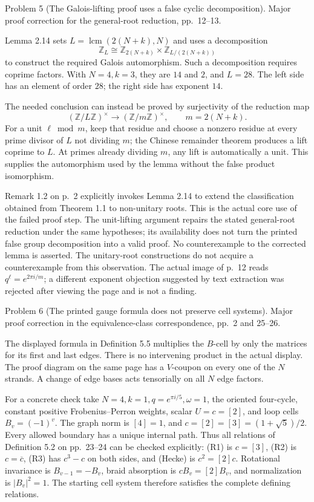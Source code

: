 \documentclass[10pt]{article}
\begin{document}
Problem 5 (The Galois-lifting proof uses a false cyclic decomposition).  Major proof correction for the general-root reduction, pp. 12–13.\par
Lemma 2.14 sets \(L=\operatorname{lcm}(2(N+k),N)\) and uses a decomposition \[\mathbb Z_L\cong
 \mathbb Z_{2(N+k)}\times\mathbb Z_{L/(2(N+k))}\] to construct the required Galois automorphism. Such a decomposition requires coprime factors. With \(N=4,k=3\), they are \(14\) and \(2\), and \(L=28\). The left side has an element of order \(28\); the right side has exponent \(14\).\par
The needed conclusion can instead be proved by surjectivity of the reduction map \[(\mathbb Z/L\mathbb Z)^\times\longrightarrow
 (\mathbb Z/m\mathbb Z)^\times,\qquad m=2(N+k).\] For a unit \(\ell\bmod m\), keep that residue and choose a nonzero residue at every prime divisor of \(L\) not dividing \(m\); the Chinese remainder theorem produces a lift coprime to \(L\). At primes already dividing \(m\), any lift is automatically a unit. This supplies the automorphism used by the lemma without the false product isomorphism.\par
Remark 1.2 on p. 2 explicitly invokes Lemma 2.14 to extend the classification obtained from Theorem 1.1 to non-unitary roots. This is the actual core use of the failed proof step. The unit-lifting argument repairs the stated general-root reduction under the same hypotheses; its availability does not turn the printed false group decomposition into a valid proof. No counterexample to the corrected lemma is asserted. The unitary-root constructions do not acquire a counterexample from this observation. The actual image of p. 12 reads \(q^\ell=e^{2\pi i/m}\); a different exponent objection suggested by text extraction was rejected after viewing the page and is not a finding.\par
Problem 6 (The printed gauge formula does not preserve cell systems).  Major proof correction in the equivalence-class correspondence, pp. 2 and 25–26.\par
The displayed formula in Definition 5.5 multiplies the \(B\)-cell by only the matrices for its first and last edges. There is no intervening product in the actual display. The proof diagram on the same page has a \(V\)-coupon on every one of the \(N\) strands. A change of edge bases acts tensorially on all \(N\) edge factors.\par
For a concrete check take \(N=4,k=1,q=e^{\pi i/5},\omega=1\), the oriented four-cycle, constant positive Frobenius–Perron weights, scalar \(U=c=[2]\), and loop cells \(B_v=(-1)^v\). The graph norm is \([4]=1\), and \(c=[2]=[3]=(1+\sqrt5)/2\). Every allowed boundary has a unique internal path. Thus all relations of Definition 5.2 on pp. 23–24 can be checked explicitly: (R1) is \(c=[3]\), (R2) is \(c=\overline c\), (R3) has \(c^3-c\) on both sides, and (Hecke) is \(c^2=[2]c\). Rotational invariance is \(B_{v-1}=-B_v\), braid absorption is \(cB_v=[2]B_v\), and normalization is \(|B_v|^2=1\). The starting cell system therefore satisfies the complete defining relations.\par
\end{document}
